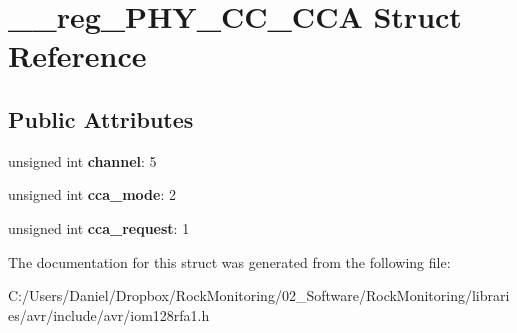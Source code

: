 \hypertarget{struct____reg___p_h_y___c_c___c_c_a}{}\section{\+\_\+\+\_\+reg\+\_\+\+P\+H\+Y\+\_\+\+C\+C\+\_\+\+C\+CA Struct Reference}
\label{struct____reg___p_h_y___c_c___c_c_a}
\subsection*{Public Attributes}
\begin{DoxyCompactItemize}
\item 
unsigned int {\bfseries channel}\+: 5\hypertarget{struct____reg___p_h_y___c_c___c_c_a_ab5e79091ba6e13f7358a3ccaf88e673e}{}\label{struct____reg___p_h_y___c_c___c_c_a_ab5e79091ba6e13f7358a3ccaf88e673e}

\item 
unsigned int {\bfseries cca\+\_\+mode}\+: 2\hypertarget{struct____reg___p_h_y___c_c___c_c_a_aba483d9c2ac3ec5c5d59ff3e5bacc706}{}\label{struct____reg___p_h_y___c_c___c_c_a_aba483d9c2ac3ec5c5d59ff3e5bacc706}

\item 
unsigned int {\bfseries cca\+\_\+request}\+: 1\hypertarget{struct____reg___p_h_y___c_c___c_c_a_ac788466a1c9bea4fcc69aebefe153eae}{}\label{struct____reg___p_h_y___c_c___c_c_a_ac788466a1c9bea4fcc69aebefe153eae}

\end{DoxyCompactItemize}


The documentation for this struct was generated from the following file\+:\begin{DoxyCompactItemize}
\item 
C\+:/\+Users/\+Daniel/\+Dropbox/\+Rock\+Monitoring/02\+\_\+\+Software/\+Rock\+Monitoring/libraries/avr/include/avr/iom128rfa1.\+h\end{DoxyCompactItemize}
